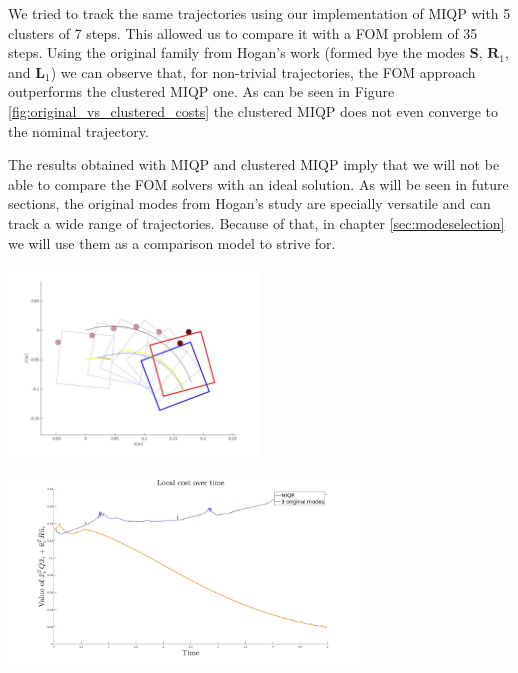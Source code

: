 \documentclass[12,twoside]{TFG-GM}
\theoremstyle{definition}
\theoremstyle{remark}
\begin{document}
We tried to track the same trajectories using our implementation of MIQP with 5 clusters of 7 steps. This allowed us to compare it with a FOM problem of 35 steps. Using the original family from Hogan's work (formed bye the modes $\textbf{S}$, $\textbf{R}_1$, and $\textbf{L}_1$) we can observe that, for non-trivial trajectories, the FOM approach outperforms the clustered MIQP one. As can be seen in Figure \ref{fig:original_vs_clustered_costs} the clustered MIQP does not even converge to the nominal trajectory.

The results obtained with MIQP and clustered MIQP imply that we will not be able to compare the FOM solvers with an ideal solution. As will be seen in future sections, the original modes from Hogan's study are specially versatile and can track a wide range of trajectories. Because of that, in chapter \ref{sec:modeselection} we will use them as a comparison model to strive for.
 
\begin{center}
\includegraphics[width=0.5\textwidth]{original_vs_clustered_trajectory.jpg}        
\label{fig:original_vs_clustered_trajectory}

\includegraphics[width=0.7\textwidth]{original_vs_clustered_costs.jpg}        
\label{fig:original_vs_clustered_costs}
\end{center}
\end{document}
